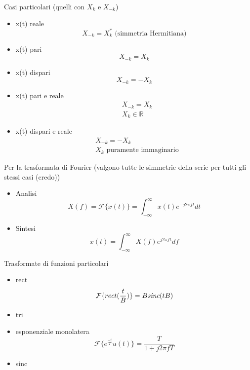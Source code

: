 \documentclass{article}
\begin{document}
Casi particolari (quelli con $X_k$ e $X_{-k}$)
\begin{itemize}
\item x(t) reale \begin{equation*}
  X_{-k} = X^*_k \text{ (simmetria Hermitiana)}
\end{equation*}
\item x(t) pari \begin{equation*}
  X_{-k} = X_k 
\end{equation*}
\item x(t) dispari \begin{equation*}
  X_{-k} = -X_k
\end{equation*}
\item x(t) pari e reale \begin{align*}
  &X_{-k} = X_k\\
  &X_k \in \mathbb{R}
\end{align*}
\item x(t) dispari e reale \begin{align*}
  &X_{-k} = -X_k \\
  &X_k\text{ puramente immaginario}
\end{align*}
\end{itemize}
Per la trasformata di Fourier (valgono tutte le simmetrie della serie per tutti gli stessi casi (credo))
\begin{itemize}
\item Analisi \begin{equation*}
  X(f)=\mathcal{F}\{x(t)\}=\int_{-\infty}^{\infty} x(t) e^{-j2\pi ft} dt
\end{equation*}
\item Sintesi \begin{equation*}
  x(t)=\int_{-\infty}^{\infty} X(f) e^{j2\pi ft} df
\end{equation*}
\end{itemize}

Trasformate di funzioni particolari
\begin{itemize}
\item rect \begin{equation*}
  \mathcal{F}\{rect(\frac{t}{B})\} = B \emph{sinc}(tB)
\end{equation*}
\item tri
\item esponenziale monolatera \begin{equation*}
  \mathcal{F}\{e^{\frac{-t}{T}}u(t)\} = \frac{T}{1 + j2\pi fT}
\end{equation*}
\item sinc
\end{itemize}
\end{document}
